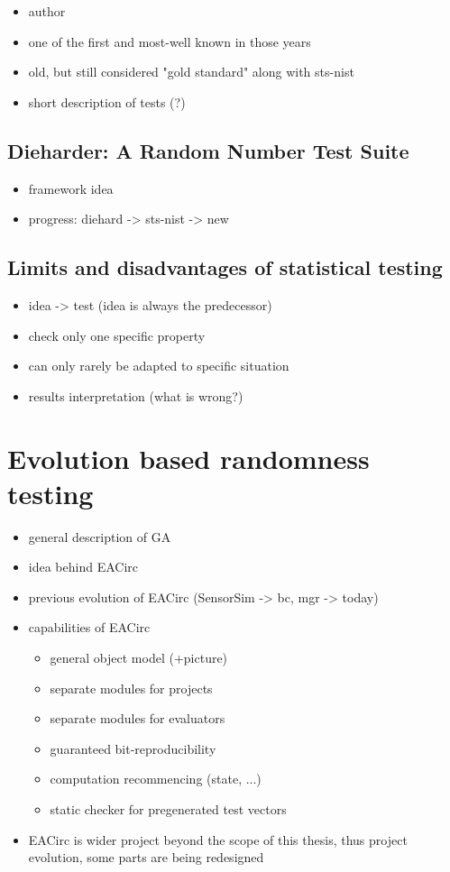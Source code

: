 \documentclass[12pt,oneside]{fithesis2}
\begin{document}
\begin{itemize}
\item author
\item one of the first and most-well known in those years
\item old, but still considered "gold standard" along with sts-nist
\item short description of tests (?)
\end{itemize}

\section{Dieharder: A Random Number Test Suite}
\label{sec:dieharder}

\begin{itemize}
\item framework idea
\item progress: diehard -> sts-nist -> new
\end{itemize}

\section{Limits and disadvantages of statistical testing}
\label{sec:limits-stat-testing}

\begin{itemize}
\item idea -> test (idea is always the predecessor)
\item check only one specific property
\item can only rarely be adapted to specific situation
\item results interpretation (what is wrong?)
\end{itemize}

\chapter{Evolution based randomness testing}
\label{chap:evo-based-testing}
\begin{itemize}
\item general description of GA
\item idea behind EACirc
\item previous evolution of EACirc (SensorSim -> bc, mgr -> today)
\item capabilities of EACirc
\begin{itemize}
\item general object model (+picture)
\item separate modules for projects
\item separate modules for evaluators
\item guaranteed bit-reproducibility
\item computation recommencing (state, ...)
\item static checker for pregenerated test vectors
\end{itemize}
\item EACirc is wider project beyond the scope of this thesis, thus project evolution, some parts are being redesigned
\end{itemize}
\end{document}
